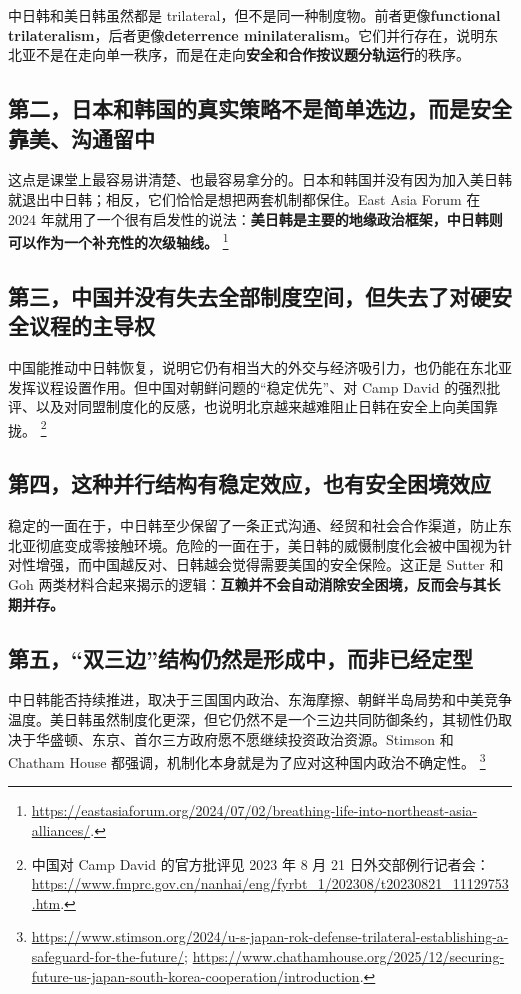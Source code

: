 \documentclass[a4paper]{article}
\begin{document}
中日韩和美日韩虽然都是 trilateral，但不是同一种制度物。前者更像\textbf{functional trilateralism}，后者更像\textbf{deterrence minilateralism}。它们并行存在，说明东北亚不是在走向单一秩序，而是在走向\textbf{安全和合作按议题分轨运行}的秩序。

\subsection{第二，日本和韩国的真实策略不是简单选边，而是安全靠美、沟通留中}

这点是课堂上最容易讲清楚、也最容易拿分的。日本和韩国并没有因为加入美日韩就退出中日韩；相反，它们恰恰是想把两套机制都保住。East Asia Forum 在 2024 年就用了一个很有启发性的说法：\textbf{美日韩是主要的地缘政治框架，中日韩则可以作为一个补充性的次级轴线。}%
\footnote{\url{https://eastasiaforum.org/2024/07/02/breathing-life-into-northeast-asia-alliances/}.}

\subsection{第三，中国并没有失去全部制度空间，但失去了对硬安全议程的主导权}

中国能推动中日韩恢复，说明它仍有相当大的外交与经济吸引力，也仍能在东北亚发挥议程设置作用。但中国对朝鲜问题的“稳定优先”、对 Camp David 的强烈批评、以及对同盟制度化的反感，也说明北京越来越难阻止日韩在安全上向美国靠拢。%
\footnote{中国对 Camp David 的官方批评见 2023 年 8 月 21 日外交部例行记者会：\url{https://www.fmprc.gov.cn/nanhai/eng/fyrbt_1/202308/t20230821_11129753.htm}.}

\subsection{第四，这种并行结构有稳定效应，也有安全困境效应}

稳定的一面在于，中日韩至少保留了一条正式沟通、经贸和社会合作渠道，防止东北亚彻底变成零接触环境。危险的一面在于，美日韩的威慑制度化会被中国视为针对性增强，而中国越反对、日韩越会觉得需要美国的安全保险。这正是 Sutter 和 Goh 两类材料合起来揭示的逻辑：\textbf{互赖并不会自动消除安全困境，反而会与其长期并存。}

\subsection{第五，“双三边”结构仍然是形成中，而非已经定型}

中日韩能否持续推进，取决于三国国内政治、东海摩擦、朝鲜半岛局势和中美竞争温度。美日韩虽然制度化更深，但它仍然不是一个三边共同防御条约，其韧性仍取决于华盛顿、东京、首尔三方政府愿不愿继续投资政治资源。Stimson 和 Chatham House 都强调，机制化本身就是为了应对这种国内政治不确定性。%
\footnote{\url{https://www.stimson.org/2024/u-s-japan-rok-defense-trilateral-establishing-a-safeguard-for-the-future/}; \url{https://www.chathamhouse.org/2025/12/securing-future-us-japan-south-korea-cooperation/introduction}.}
\end{document}
